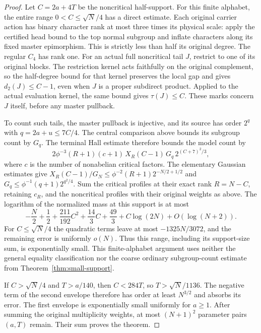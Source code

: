 \begin{proof}
Let $C=2a+4T$ be the noncritical half-support. For this finite alphabet,
the entire range $0<C\leq\sqrt N/4$ has a direct estimate. Each original
carrier action has binary character rank at most three times its physical
scale: apply the certified head bound to the top normal subgroup and
inflate characters along its fixed master epimorphism. This is strictly
less than half its original degree. The regular $C_4$ has rank one.
For an actual full noncritical tail $J$, restrict to one of its original
blocks. The restriction kernel acts faithfully on the original complement,
so the half-degree bound for that kernel preserves the local gap and gives
$d_2(J)\leq C-1$, even when $J$ is a proper subdirect product. Applied to
the actual evaluation kernel, the same bound gives $\tau(J)\leq C$.
These marks concern $J$ itself, before any master pullback.

To count such tails, the master pullback is injective, and its source
has order $2^q$ with $q=2a+u\leq7C/4$. The central comparison above
bounds its subgroup count by $G_q$. The terminal Hall estimate therefore
bounds the model count by
\[
 2\phi^{-3}(R+1)(c+1)\,X_R(C-1)\,G_q\,
       2^{(C+7)^2/3},
\]
where $c$ is the number of nonabelian critical factors. The elementary
Gaussian estimates give
$X_R(C-1)/G_N\leq\phi^{-2}(R+1)2^{-N/2+1/2}$ and
$G_q\leq\phi^{-1}(q+1)2^{q^2/4}$. Sum the critical profiles at their
exact rank $R=N-C$, retaining $c_R$, and the noncritical profiles with
their original weights as above. The logarithm of the normalized mass
at this support is at most
\[
 -\frac N2+\frac12+\frac{211}{192}C^2+\frac{14}{3}C+\frac{49}{3}
   +C\log(2N)+O(\log(N+2)).
\]
For $C\leq\sqrt N/4$ the quadratic terms leave at most
$-1325N/3072$, and the remaining error is uniformly $o(N)$.
Thus this range, including its support-size sum, is exponentially small.
This finite-alphabet argument uses neither the general equality
classification nor the coarse ordinary subgroup-count estimate from
Theorem~\ref{thm:small-support}.

If $C>\sqrt N/4$ and $T>a/140$, then $C<284T$, so
$T>\sqrt N/1136$. The negative term of the second envelope therefore
has order at least $N^{3/2}$ and absorbs its error. The first envelope
is exponentially small uniformly for $a\geq1$. After summing the original
multiplicity weights, at most $(N+1)^2$ parameter pairs $(a,T)$ remain.
Their sum proves the theorem.
\end{proof}

